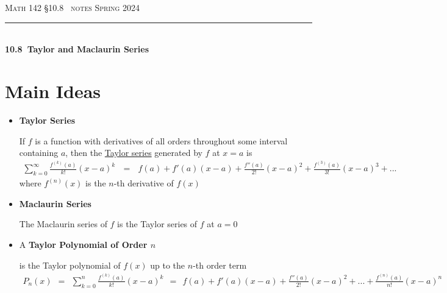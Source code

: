 \documentclass{article}
\def\chapt{10.8}
\def\chaptname{Taylor and Maclaurin Series}
\begin{document}
\noindent
{\scshape Math 142} \hfill {\scshape \S\chapt~ notes} \hfill {\scshape Spring 2024}

\smallskip

\hrule

\bigskip

\hfill
\\

{
\huge
\noindent
\textbf{\chapt~\chaptname}
}

\section*{Main Ideas}

\begin{itemize}

\item
\textbf{Taylor Series}

If $f$ is a function with derivatives of all orders throughout some interval containing
$a$, then the \underline{Taylor series} generated by $f$ at $x=a$ is
\begin{gather*}
\sum_{k=0}^{\infty} \frac{f^{(k)}(a)}{k!}(x-a)^k
~~~=~~~
f(a)+f'(a)(x-a)+\frac{f''(a)}{2!}(x-a)^2+\frac{f^{(3)}(a)}{3!}(x-a)^3+...
\end{gather*}
where $f^{(n)}(x)$ is the $n$-th derivative of $f(x)$
\\

\item
\textbf{Maclaurin Series}

The Maclaurin series of $f$ is the Taylor series of $f$ at $a=0$
\\

\item
A \textbf{Taylor Polynomial of Order $n$}

is the Taylor polynomial of $f(x)$ up
to the $n$-th order term
\begin{gather*}
P_n (x) ~~=~~
\sum_{k=0}^{n} \frac{f^{(k)}(a)}{k!}(x-a)^k ~~=~~
f(a)+f'(a)(x-a)+\frac{f''(a)}{2!}(x-a)^2+...+\frac{f^{(n)}(a)}{n!}(x-a)^n
\end{gather*}

\end{itemize}
\end{document}
